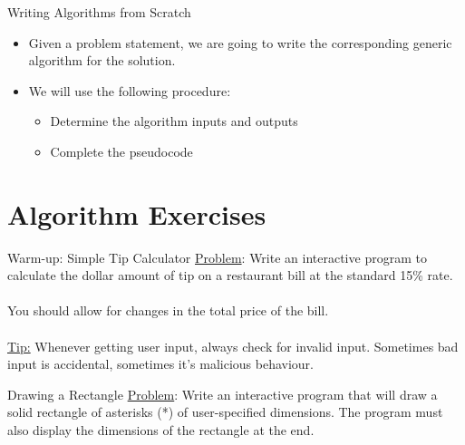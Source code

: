 \documentclass[graphics]{beamer}
\begin{document}
\begin{frame}{Writing Algorithms from Scratch}
    \begin{itemize}
        \item Given a problem statement, we are going to write the corresponding generic algorithm for the solution.
        \item We will use the following procedure:
        \begin{itemize}
            \item Determine the algorithm inputs and outputs
            \item Complete the pseudocode
        \end{itemize}
    \end{itemize}
\end{frame}

\section{Algorithm Exercises}
\begin{frame}{Warm-up: Simple Tip Calculator}
    \underline{Problem}:  Write an interactive program to calculate the dollar amount of tip on a restaurant bill at the standard 15\% rate.
    \\ ~~ \\
	You should allow for changes in the total price of the bill. \\ ~~ \\
	\underline{Tip:} Whenever getting user input, always check for invalid input. Sometimes bad input is accidental, sometimes it's malicious behaviour.
\end{frame}

\begin{frame}{Drawing a Rectangle}
    \underline{Problem}:  Write an interactive program that will draw a solid rectangle of asterisks (*) of user-specified dimensions.  The program must also display the dimensions of the rectangle at the end. 
\end{frame}
\end{document}
